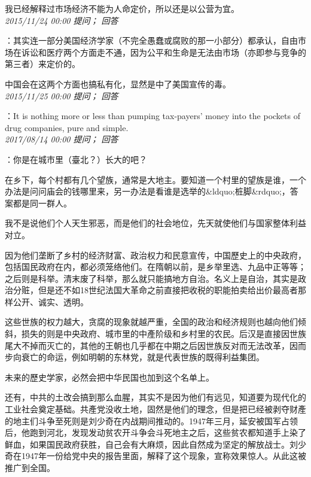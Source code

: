\documentclass[twocolumn]{ctexart}
\begin{document}
我已经解释过市场经济不能为人命定价，所以还是以公营为宜。\\

\textit{\hfill\noindent\small 2015/11/24 00:00 提问； 回答}

：其实连一部分美国经济学家（不完全愚蠢或腐败的那一小部分）都承认，自由市场在诉讼和医疗两个方面走不通，因为公平和生命是无法由市场（亦即参与竞争的第三者）来定价的。

中国会在这两个方面也搞私有化，显然是中了美国宣传的毒。\\

\textit{\hfill\noindent\small 2015/11/25 00:00 提问； 回答}

：It is nothing more or less than pumping tax-payers' money into the pockets of drug companies, pure and simple.\\

\textit{\hfill\noindent\small 2017/08/14 00:00 提问； 回答}

：你是在城市里（臺北？）长大的吧？

在乡下，每个村都有几个望族，通常是大地主。要知道一个村里的望族是谁，一个办法是问问庙会的钱哪里来，另一办法是看谁是选举的\&ldquo;桩脚\&rdquo;，答案都是同一群人。

我不是说他们个人天生邪恶，而是他们的社会地位，先天就使他们与国家整体利益对立。

因为他们垄断了乡村的经济财富、政治权力和民意宣传，中国歷史上的中央政府，包括国民政府在内，都必须笼络他们。在隋朝以前，是乡举里选、九品中正等等；之后则是科举。清末废了科举，那么就只能搞地方自治。名义上是自治，其实是政治分赃，但是还不如18世纪法国大革命之前直接把收税的职能拍卖给出价最高者那样公开、诚实、透明。

这些世族的权力越大，贪腐的现象就越严重，全国的政治和经济规则也越向他们倾斜，损失的则是中央政府、城市里的中產阶级和乡村里的农民。后汉是直接因世族尾大不掉而灭亡的，其他的王朝也几乎都在中期之后因世族反对而无法改革，因而步向衰亡的命运，例如明朝的东林党，就是代表世族的既得利益集团。

未来的歷史学家，必然会把中华民国也加到这个名单上。

还有，中共的土改会搞到那么血腥，其实不是因为他们有远见，知道要为现代化的工业社会奠定基础。共產党没收土地，固然是他们的理念，但是把已经被剥夺财產的地主们斗争至死则是刘少奇在内战期间推动的。1947年三月，延安被国军占领后，他跑到河北，发现发动贫农开斗争会斗死地主之后，这些贫农都知道手上染了鲜血，如果国民政府获胜，自己会有大麻烦，因此自然成为坚定的解放战士。刘少奇在1947年一份给党中央的报告里面，解释了这个现象，宣称效果惊人。从此这被推广到全国。
\end{document}
